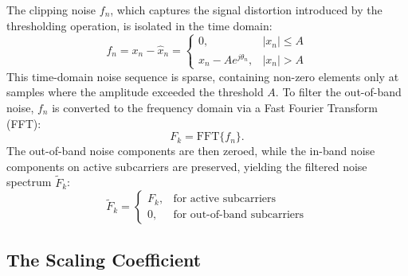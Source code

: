 The clipping noise $f_n$, which captures the signal distortion introduced by the thresholding operation, is isolated in the time domain:
\begin{equation*}
    f_n = x_n - \hat{x}_n = \begin{cases}
        0,                      & |x_n| \le A \\
        x_n - A e^{j \theta_n}, & |x_n| > A
    \end{cases}
\end{equation*}
This time-domain noise sequence is sparse, containing non-zero elements only at samples where the amplitude exceeded the threshold $A$. To filter the out-of-band noise, $f_n$ is converted to the frequency domain via a Fast Fourier Transform (FFT):
\begin{equation*}
    F_k = \mathrm{FFT}\{f_n\}.
\end{equation*}
The out-of-band noise components are then zeroed, while the in-band noise components on active subcarriers are preserved, yielding the filtered noise spectrum $\tilde{F}_k$:
\begin{equation*}
    \tilde{F}_k = \begin{cases}
        F_k, & \text{for active subcarriers}      \\
        0,   & \text{for out-of-band subcarriers}
    \end{cases}
\end{equation*}

\subsection{The Scaling Coefficient}

